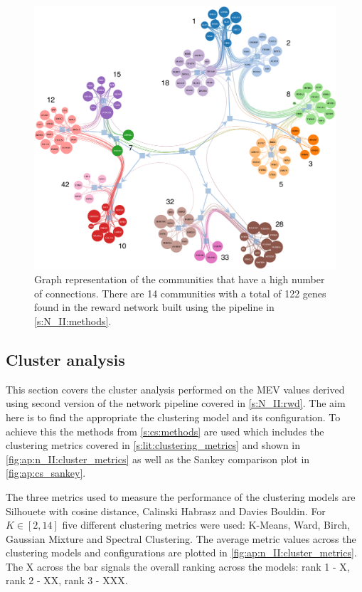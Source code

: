 \begin{figure}[H]    
    \centering
\includegraphics[width=1.0\textwidth,height=1.0\textheight,keepaspectratio]{Sections/Network_II/resources/reward/sel_communities.png}
    \caption[Highly connected communities from the reward network]{Graph representation of the communities that have a high number of connections. There are 14 communities with a total of 122 genes found in the reward network built using the pipeline in \cref{s:N_II:methods}. }
    \label{fig:ap:graph_smallCom}
\end{figure}



\subsection{Cluster analysis} \label{s:ap:N_II:clustering analysis}

This section covers the cluster analysis performed on the MEV values derived using second version of the network pipeline covered in \cref{s:N_II:rwd}. The aim here is to find the appropriate the clustering model and its configuration. To achieve this the methods from \cref{s:cs:methods} are used which includes the clustering metrics covered in \cref{s:lit:clustering_metrics} and shown in \cref{fig:ap:n_II:cluster_metrics} as well as the Sankey comparison plot in \cref{fig:ap:cs_sankey}.

The three metrics used to measure the performance of the clustering models are Silhouete with cosine distance, Calinski Habrasz and Davies Bouldin. For $K\in[2,14]$ five different clustering metrics were used: K-Means, Ward, Birch, Gaussian Mixture and Spectral Clustering. The average metric values across the clustering models and configurations are plotted in \cref{fig:ap:n_II:cluster_metrics}. The X across the bar signals the overall ranking across the models: rank 1 - X, rank 2 - XX, rank 3 - XXX.


